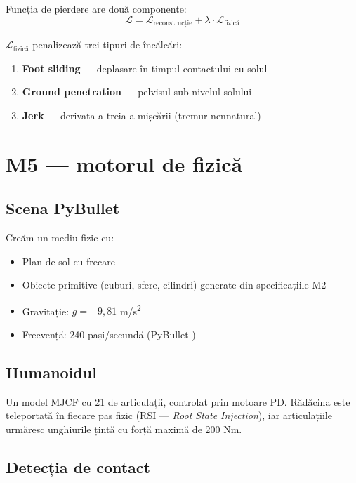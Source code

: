 Funcția de pierdere are două componente:
\[
    \mathcal{L} = \mathcal{L}_{\text{reconstrucție}} + \lambda \cdot \mathcal{L}_{\text{fizică}}
\]

$\mathcal{L}_{\text{fizică}}$ penalizează trei tipuri de încălcări:
\begin{enumerate}
    \item \textbf{Foot sliding} --- deplasare în timpul contactului cu solul
    \item \textbf{Ground penetration} --- pelvisul sub nivelul solului
    \item \textbf{Jerk} --- derivata a treia a mișcării (tremur nennatural)
\end{enumerate}

\section{M5 --- motorul de fizică}

\subsection{Scena PyBullet}

Creăm un mediu fizic cu:
\begin{itemize}
    \item Plan de sol cu frecare
    \item Obiecte primitive (cuburi, sfere, cilindri) generate din specificațiile M2
    \item Gravitație: $g = -9{,}81$ m/s\textsuperscript{2}
    \item Frecvență: 240 pași/secundă (PyBullet \cite{coumans2021pybullet})
\end{itemize}

\subsection{Humanoidul}

Un model MJCF cu 21 de articulații, controlat prin motoare PD.  Rădăcina este teleportată în fiecare pas fizic (RSI --- \textit{Root State Injection}), iar articulațiile urmăresc unghiurile țintă cu forță maximă de 200 Nm.

\subsection{Detecția de contact}

